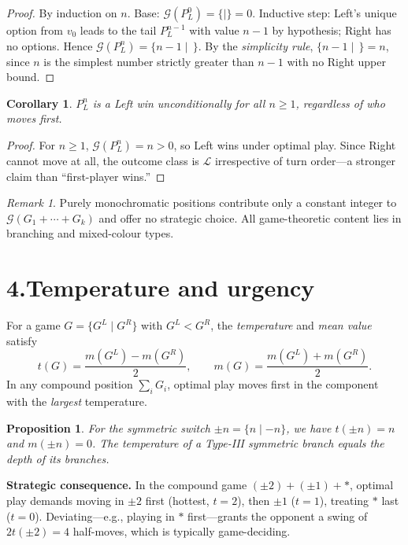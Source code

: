\documentclass[10pt,twocolumn]{article}
\theoremstyle{plain}
\newtheorem{proposition}[theorem]{Proposition}
\newtheorem{corollary}[theorem]{Corollary}
\theoremstyle{definition}
\theoremstyle{remark}
\newtheorem{remark}[theorem]{Remark}
\newcommand{\val}[1]{\mathcal{G}(#1)}
\newcommand{\temp}[1]{t(#1)}
\newcommand{\mean}[1]{m(#1)}
\begin{document}
\begin{proof}
By induction on $n$.  Base: $\val{P^0_L}=\{|\}=0$.
Inductive step: Left's unique option from $v_0$ leads to the tail
$P^{n-1}_L$ with value $n-1$ by hypothesis; Right has no options.
Hence $\val{P^n_L}=\{n-1\mid\,\}$.
By the \emph{simplicity rule}, $\{n-1\mid\,\}=n$, since $n$ is the
simplest number strictly greater than $n-1$ with no Right upper bound.
\end{proof}

\begin{corollary}\label{cor:outcome}
$P^n_L$ is a Left win unconditionally for all $n\ge 1$,
regardless of who moves first.
\end{corollary}

\begin{proof}
For $n\ge 1$, $\val{P^n_L}=n>0$, so Left wins under optimal play.
Since Right cannot move at all, the outcome class is $\mathcal{L}$
irrespective of turn order---a stronger claim than ``first-player wins.''
\end{proof}

\begin{remark}
Purely monochromatic positions contribute only a constant integer to
$\val{G_1+\cdots+G_k}$ and offer no strategic choice.  All
game-theoretic content lies in branching and mixed-colour types.
\end{remark}

\section{4.\enspace Temperature and urgency}

For a game $G=\{G^L\mid G^R\}$ with $G^L < G^R$, the \emph{temperature}
and \emph{mean value} satisfy
\[
  \temp{G} = \frac{\mean{G^L}-\mean{G^R}}{2}, \qquad
  \mean{G} = \frac{\mean{G^L}+\mean{G^R}}{2}.
\]
In any compound position $\sum_i G_i$, optimal play moves first in the
component with the \emph{largest} temperature.

\begin{proposition}\label{prop:temp}
For the symmetric switch $\pm n = \{n\mid{-n}\}$, we have
$\temp{\pm n} = n$ and $\mean{\pm n}=0$.
The temperature of a Type-III symmetric branch equals the depth
of its branches.
\end{proposition}

\noindent\textbf{Strategic consequence.}
In the compound game $(\pm 2)+(\pm 1)+{*}$, optimal play demands
moving in $\pm 2$ first (hottest, $t=2$), then $\pm 1$ ($t=1$),
treating $*$ last ($t=0$).
Deviating---e.g., playing in $*$ first---grants the opponent a swing of
$2t(\pm 2)=4$ half-moves, which is typically game-deciding.
\end{document}
